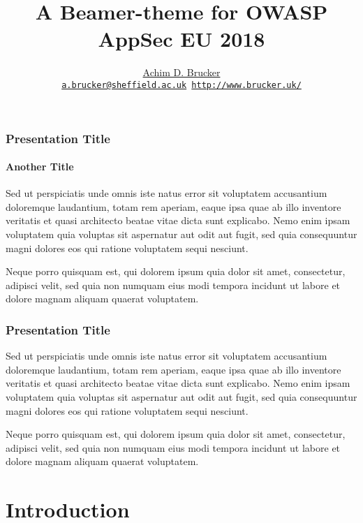 \documentclass[9pt,aspectratio=169,classification=confidential]{appseceu2018}
\title{A Beamer-theme for OWASP AppSec EU 2018}
\institute[The University of Sheffield]
{Department of Computer Science, The University of Sheffield, Sheffield, UK}
\author[Achim D. Brucker] {%
    \href{http://www.brucker.uk/}{Achim D. Brucker}\\
    \texttt{\footnotesize\href{mailto:"Achim D. Brucker"
        <a.brucker@sheffield.ac.uk>}{a.brucker@sheffield.ac.uk}
      \hspace{.6cm}
      \url{http://www.brucker.uk/}}
    }
\begin{document}
\begin{frame}[plain]
  \maketitle
\end{frame}

\begin{frame}[t]
  \frametitle{Presentation Title}
  \framesubtitle{Another Title}
  Sed ut perspiciatis unde omnis iste natus error sit voluptatem accusantium doloremque
  laudantium, totam rem aperiam, eaque ipsa quae ab illo inventore veritatis et quasi architecto
  beatae vitae dicta sunt explicabo. Nemo enim ipsam voluptatem quia voluptas sit aspernatur aut
  odit aut fugit, sed quia consequuntur magni dolores eos qui ratione voluptatem sequi nesciunt.

  Neque porro quisquam est, qui dolorem ipsum quia dolor sit amet, consectetur, adipisci velit, sed
  quia non numquam eius modi tempora incidunt ut labore et dolore magnam aliquam quaerat
  voluptatem.
\end{frame}

\begin{frame}[t]
  \frametitle{Presentation Title}
  Sed ut perspiciatis unde omnis iste natus error sit voluptatem accusantium doloremque
  laudantium, totam rem aperiam, eaque ipsa quae ab illo inventore veritatis et quasi architecto
  beatae vitae dicta sunt explicabo. Nemo enim ipsam voluptatem quia voluptas sit aspernatur aut
  odit aut fugit, sed quia consequuntur magni dolores eos qui ratione voluptatem sequi nesciunt.

  Neque porro quisquam est, qui dolorem ipsum quia dolor sit amet, consectetur, adipisci velit, sed
  quia non numquam eius modi tempora incidunt ut labore et dolore magnam aliquam quaerat
  voluptatem.
\end{frame}

\AgendaFrame

\section{Introduction}
\end{document}
